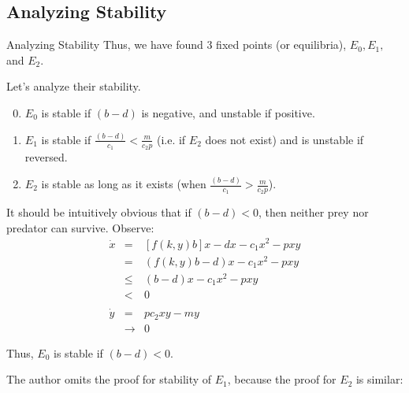 \documentclass{beamer}
\begin{document}
\subsection{Analyzing Stability}
\begin{frame}{Analyzing Stability}
Thus, we have found 3 fixed points (or equilibria), $E_0, E_1,$ and $E_2$.

Let's analyze their stability. 
\begin{theorem}[3.1]
\begin{enumerate}
\setcounter{enumi}{-1}
\item $E_0$ is stable if $(b-d)$ is negative, and unstable if positive.
\item $E_1$ is stable if $\frac{(b-d)}{c_1}<\frac{m}{c_2p}$ (i.e. if $E_2$ does not exist) and is unstable if reversed.
\item $E_2$ is stable as long as it exists (when $\frac{(b-d)}{c_1}>\frac{m}{c_2p}$). 
\end{enumerate}
\end{theorem}
\end{frame}
\begin{frame}
It should be intuitively obvious that if $(b-d)<0$, then neither prey nor predator can survive. Observe:
\[\begin{array}{rcl}
\dot{x}&=&[f(k,y)b]x-dx-c_1x^2-pxy\\
&=&(f(k,y)b-d)x-c_1x^2-pxy\\
&\leq&(b-d)x-c_1x^2-pxy\\
&<&0\\
\\
\dot{y}&=&pc_2xy-my\\
&\to&0
\end{array}\]

Thus, $E_0$ is stable if $(b-d)<0$. 

The author omits the proof for stability of $E_1$, because the proof for $E_2$ is similar:
\end{frame}
\end{document}
